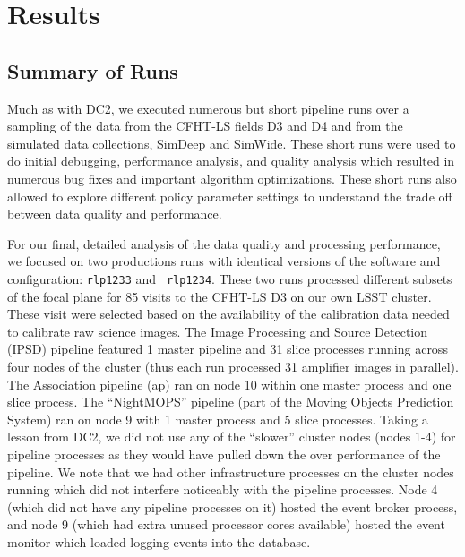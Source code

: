 \newcommand{\stc}[1]{\hbox to 2.5em{{#1}\hfil}}

\section{Results}

\subsection{Summary of Runs}

Much as with DC2, we executed numerous but short pipeline runs over
a sampling of the data from the CFHT-LS fields D3 and D4 and from the
simulated data collections, SimDeep and SimWide.  These short runs
were used to do initial debugging, performance analysis, and quality
analysis which resulted in numerous bug fixes and important algorithm
optimizations.  These short runs also allowed to explore different
policy parameter settings to understand the trade off between data
quality and performance.  

For our final, detailed analysis of the data quality and processing
performance, we focused on two productions runs with identical
versions of the software and configuration: {\tt rlp1233} and {\tt
rlp1234}.  These two runs
processed different subsets of the focal plane for 85 visits to the
CFHT-LS D3 on our own LSST cluster.  These visit were selected based
on the availability of the calibration data needed to calibrate raw
science images.  The Image Processing and Source Detection (IPSD)
pipeline featured 1 master pipeline and 31 slice processes running
across four nodes of the cluster (thus each run processed 31 amplifier
images in parallel).  The Association pipeline (ap) ran on node 10
within one master process and one slice process.  The ``NightMOPS''
pipeline (part of the Moving Objects Prediction System) ran on node 9
with 1 master process and 5 slice processes.  Taking a lesson from
DC2, we did not use any of the ``slower'' cluster nodes (nodes 1-4)
for pipeline processes as they would have pulled down the over
performance of the pipeline.  We note that we had other infrastructure
processes on the cluster nodes running which did not interfere
noticeably with the pipeline processes.  Node 4 (which did not have
any pipeline processes on it) hosted the event broker process, and
node 9 (which had extra unused processor cores available) hosted the
event monitor which loaded logging events into the database.

